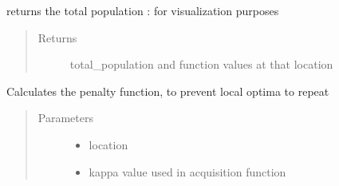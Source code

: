 \documentclass[letterpaper,12pt,english]{sphinxmanual}
\begin{document}
\begin{fulllineitems}

\begin{fulllineitems}
\label{\detokenize{PARyOpt:PARyOpt.paryopt.BayesOpt.get_total_population}}
\sphinxAtStartPar
returns the total population : for visualization purposes
\begin{quote}\begin{description}
\item[{Returns}] \leavevmode
\sphinxAtStartPar
total\_population and function values at that location

\end{description}\end{quote}

\end{fulllineitems}


\begin{fulllineitems}
\label{\detokenize{PARyOpt:PARyOpt.paryopt.BayesOpt.penalty_function}}
\sphinxAtStartPar
Calculates the penalty function, to prevent local optima to repeat
\begin{quote}\begin{description}
\item[{Parameters}] \leavevmode\begin{itemize}
\item {} 
\sphinxAtStartPar
{} \textendash{} location

\item {} 
\sphinxAtStartPar
{} \textendash{} kappa value used in acquisition function


\end{itemize}
\end{description}
\end{quote}
\end{fulllineitems}
\end{fulllineitems}
\end{document}

